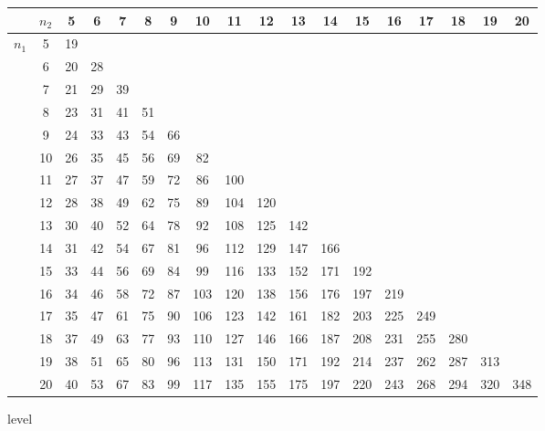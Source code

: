 \documentclass[a4paper,12pt]{article}
\begin{document}
\normalsize
\begin{tabular}{|cc||c|c|c|c|c|c|c|c|c|c|c|c|c|c|c|c|}
\hline
& $n_2$& 5 &  6 &  7&8& 9&10 &  11 &  12 &  13 &  14 &  15 &  16 &  17 &  18 &  19 &  20 \\ \hline \hline
$n_1$& 5 &  19  &&& &&&& &&&& &&&&\\ \hline
&6 &  20 &  28  &&&& && &&&& &&&&\\ \hline
& 7 &  21 &  29 &  39 &&&& & &&&& &&&&\\ \hline
& 8 &  23 &  31 &  41 &  51&&&&&  &&& &&&&\\ \hline
& 9 &  24 &  33 &  43 &  54 &  66&&&& && &&&&&\\ \hline
& 10 &  26 &  35 &  45 &  56 &  69 &  82 &&& &&& &&&&\\ \hline
& 11 &  27 &  37 &  47 &  59 &  72 &  86 &  100 &&&&&& &&& \\ \hline
& 12 &  28 &  38 &  49 &  62 &  75 &  89 &  104 &  120 &&&& &&&&\\ \hline
& 13 &  30 &  40 &  52 &  64 &  78 &  92 &  108 &  125 &  142 &&&&  &&&\\ \hline
& 14 &  31 &  42 &  54 &  67 &  81 &  96 &  112 &  129 &  147 &  166 &&&& && \\ \hline
& 15 &  33 &  44 &  56 &  69 &  84 &  99 &  116 &  133 &  152 &  171 &  192 &&&  && \\ \hline
& 16 &  34 &  46 &  58 &  72 &  87 &  103 &  120 &  138 &  156 &  176 &  197 &  219  &&&& \\ \hline
& 17 &  35 &  47 &  61 &  75 &  90 &  106 &  123 &  142 &  161 &  182 &  203 &  225 &  249 &&&\\ \hline
& 18 &  37 &  49 &  63 &  77 &  93 &  110 &  127 &  146 &  166 &  187 &  208 &  231 &  255 &  280 &&\\ \hline
& 19 &  38 &  51 &  65 &  80 &  96 &  113 &  131 &  150 &  171 &  192 &  214 &  237 &  262 &  287 &  313 &\\ \hline
& 20 &  40 &  53 &  67 &  83 &  99 &  117 &  135 &  155 &  175 &  197 &  220 &  243 &  268 &  294 &  320 &  348 \\ \hline
\end{tabular}
   level\\
\end{document}
